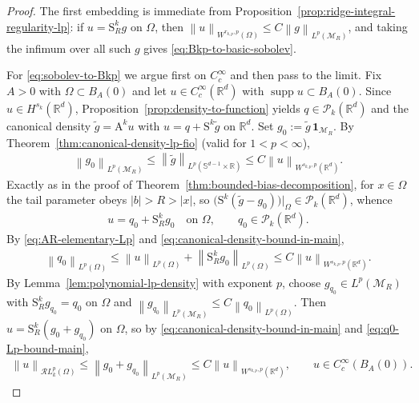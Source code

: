 \documentclass[12pt]{article}
\numberwithin{equation}{section}
\numberwithin{figure}{section}
\numberwithin{equation}{section}
\newcommand{\R}{\mathbb{R}}
\newcommand{\Sph}{\mathbb S}
\newcommand{\MR}{\mathcal M_R}
\newcommand{\norm}[1]{\left\|#1\right\|}
\DeclareMathOperator{\supp}{supp}
\begin{document}
\begin{proof}
The first embedding is immediate from
Proposition~\ref{prop:ridge-integral-regularity-lp}: if $u=\mathrm{S}^k_R g$ on
$\Omega$, then $\norm{u}_{W^{r_{k,p},p}(\Omega)}\le C\norm{g}_{L^p(\MR)}$, and
taking the infimum over all such $g$ gives \eqref{eq:Bkp-to-basic-sobolev}.

For \eqref{eq:sobolev-to-Bkp} we argue first on $C_c^\infty$ and then pass to the
limit.  Fix $A>0$ with $\Omega\subset B_A(0)$ and let
$u\in C_c^\infty(\R^d)$ with $\supp u\subset B_A(0)$.  Since $u\in H^{s_k}(\R^d)$,
Proposition~\ref{prop:density-to-function} yields $q\in\mathcal P_k(\R^d)$ and the
canonical density $\widetilde g=\mathrm{A}^k u$ with $u=q+\mathrm{S}^k\widetilde g$ on
$\R^d$.  Set $g_0:=\widetilde g\,\mathbf 1_{\MR}$.  By
Theorem~\ref{thm:canonical-density-lp-fio} (valid for $1<p<\infty$),
\begin{align}
    \norm{g_0}_{L^p(\MR)}
    \le\norm{\widetilde g}_{L^p(\Sph^{d-1}\times\R)}
    \le C\norm{u}_{W^{s_{k,p},p}(\R^d)} .
    \label{eq:canonical-density-bound-in-main}
\end{align}
Exactly as in the proof of Theorem~\ref{thm:bounded-bias-decomposition}, for
$x\in\Omega$ the tail parameter obeys $|b|>R>|x|$, so
$\bigl(\mathrm{S}^k(\widetilde g-g_0)\bigr)|_\Omega\in\mathcal P_k(\R^d)$, whence
\begin{align*}
    u=q_0+\mathrm{S}^k_R g_0\quad\text{on }\Omega,
    \qquad q_0\in\mathcal P_k(\R^d).
\end{align*}
By \eqref{eq:AR-elementary-Lp} and \eqref{eq:canonical-density-bound-in-main},
\begin{align}
    \norm{q_0}_{L^p(\Omega)}
    \le\norm{u}_{L^p(\Omega)}+\norm{\mathrm{S}^k_R g_0}_{L^p(\Omega)}
    \le C\norm{u}_{W^{s_{k,p},p}(\R^d)} .
    \label{eq:q0-Lp-bound-main}
\end{align}
By Lemma~\ref{lem:polynomial-lp-density} with exponent $p$, choose
$g_{q_0}\in L^p(\MR)$ with $\mathrm{S}^k_R g_{q_0}=q_0$ on $\Omega$ and
$\norm{g_{q_0}}_{L^p(\MR)}\le C\norm{q_0}_{L^p(\Omega)}$.  Then
$u=\mathrm{S}^k_R(g_0+g_{q_0})$ on $\Omega$, so by
\eqref{eq:canonical-density-bound-in-main} and \eqref{eq:q0-Lp-bound-main},
\begin{align}
    \norm{u}_{\mathcal{R}L^p_k(\Omega)}
    \le\norm{g_0+g_{q_0}}_{L^p(\MR)}
    \le C\norm{u}_{W^{s_{k,p},p}(\R^d)},
    \qquad u\in C_c^\infty(B_A(0)).
    \label{eq:Ccinfty-bound-lp}
\end{align}


\end{proof}
\end{document}
